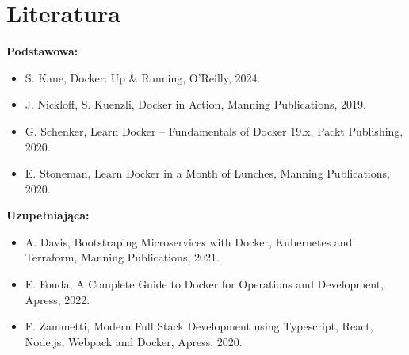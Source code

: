 \documentclass[12pt, a4paper]{article}
\begin{document}
\section{Literatura}

\textbf{Podstawowa:}
\begin{itemize}
  \item S. Kane, Docker: Up \& Running, O’Reilly, 2024.
  \item J. Nickloff, S. Kuenzli, Docker in Action, Manning Publications, 2019.
  \item G. Schenker, Learn Docker – Fundamentals of Docker 19.x, Packt Publishing, 2020.
  \item E. Stoneman, Learn Docker in a Month of Lunches, Manning Publications, 2020.
\end{itemize}

\textbf{Uzupełniająca:}
\begin{itemize}
  \item A. Davis, Bootstraping Microservices with Docker, Kubernetes and Terraform, Manning Publications, 2021.
  \item E. Fouda, A Complete Guide to Docker for Operations and Development, Apress, 2022.
  \item F. Zammetti, Modern Full Stack Development using Typescript, React, Node.js, Webpack and Docker, Apress, 2020.
\end{itemize}
\end{document}
